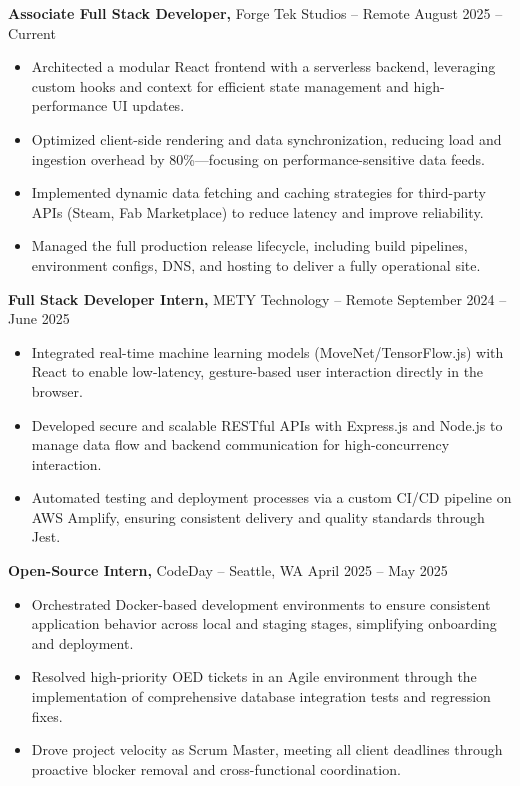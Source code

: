 \documentclass[11pt]{article}       %
\begin{document}
\textbf{Associate Full Stack Developer,} {Forge Tek Studios} -- Remote \hfill August 2025 -- Current 
\vspace{-9pt}
\begin{itemize}
  \item Architected a modular React frontend with a serverless backend, leveraging custom hooks and context for efficient state management and high-performance UI updates.
  \item Optimized client-side rendering and data synchronization, reducing load and ingestion overhead by 80\%—focusing on performance-sensitive data feeds.
  \item Implemented dynamic data fetching and caching strategies for third-party APIs (Steam, Fab Marketplace) to reduce latency and improve reliability.
  \item Managed the full production release lifecycle, including build pipelines, environment configs, DNS, and hosting to deliver a fully operational site.
\end{itemize}

\textbf{Full Stack Developer Intern,} {METY Technology} -- Remote \hfill September 2024 -- June 2025 
\vspace{-9pt}
\begin{itemize}
  \item Integrated real-time machine learning models (MoveNet/TensorFlow.js) with React to enable low-latency, gesture-based user interaction directly in the browser.
  \item Developed secure and scalable RESTful APIs with Express.js and Node.js to manage data flow and backend communication for high-concurrency interaction.
  \item Automated testing and deployment processes via a custom CI/CD pipeline on AWS Amplify, ensuring consistent delivery and quality standards through Jest.
\end{itemize}

\textbf{Open-Source Intern,} {CodeDay} -- Seattle, WA \hfill April 2025 -- May 2025 \\
\vspace{-9pt}
\begin{itemize}
  \item Orchestrated Docker-based development environments to ensure consistent application behavior across local and staging stages, simplifying onboarding and deployment.
  \item Resolved high-priority OED tickets in an Agile environment through the implementation of comprehensive database integration tests and regression fixes.
  \item Drove project velocity as Scrum Master, meeting all client deadlines through proactive blocker removal and cross-functional coordination.
\end{itemize}
\end{document}
